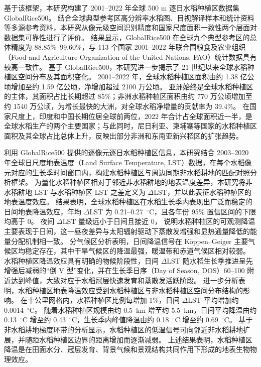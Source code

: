 基于该框架，本研究构建了 2001--2022 年全球 500 m 逐日水稻种植区数据集 GlobalRice500。
结合全球典型参考区高分辨率水稻图、目视解译样本和统计资料等多源参考资料，本研究从像元级空间识别精度和国家尺度面积一致性两个层面对数据集可靠性进行了评价。%
结果显示，GlobalRice500 在全球九个典型参考区的总体精度为 88.85\%--99.60\%，与 113 个国家 2001--2022 年联合国粮食及农业组织（Food and Agriculture Organization of the United Nations, FAO）统计数据具有较高一致性。%
基于 GlobalRice500，本研究进一步揭示了 21 世纪以来全球水稻种植区空间分布及其面积变化。
2001--2022 年，全球水稻种植区面积由约 1.38 亿公顷增加至约 1.59 亿公顷，净增加超过 2100 万公顷。
亚洲始终是全球水稻种植区的主体，其面积占比长期超过 85\%；非洲水稻种植区面积由约 770 万公顷增加至约 1540 万公顷，为增长最快的大洲，对全球水稻净增量的贡献率为 39.4\%。
在国家尺度上，印度和中国长期位居全球前两位，2022 年合计占全球面积近一半，是全球水稻生产的两个主要国家；与此同时，尼日利亚、柬埔寨等国家的水稻种植区面积及其全球占比总体上升，反映出部分非洲和东南亚新兴稻区的扩张趋势。

利用 GlobalRice500 提供的逐像元逐日水稻种植区信息，本研究结合 2003--2020 年全球日尺度地表温度（Land Surface Temperature, LST）数据，在每个水稻像元对应的生长季时间窗口内，构建水稻种植区与周边同期非水稻耕地的匹配对照分析框架。
为量化水稻种植区相对于邻近非水稻耕地的地表温度差异，本研究将非水稻耕地 LST 与水稻种植区 LST 之差定义为 $\Delta \mathrm{LST}$，并以此表征水稻种植区的地表温度效应。
结果表明，全球水稻种植区在水稻生长季内表现出广泛而稳定的日间地表降温效应，年均 $\Delta \mathrm{LST}$ 为 0.21--0.27~$^\circ$C，且各年份 95\% 置信区间的下限均高于 0。
夜间 $\Delta \mathrm{LST}$ 量级远小于日间且接近 0，
说明水稻种植区的可观测降温主要表现于日间，这一昼夜差异与太阳辐射驱动下蒸散发增强和显热通量降低的能量分配机制相一致。
分气候区分析表明，日间降温信号在 Köppen--Geiger 主要气候区均稳定存在，其中干旱气候区的降温最强，暖温带和赤道气候区相对较弱。
水稻种植区降温效应具有明确的物候阶段性，日间 $\Delta \mathrm{LST}$ 随水稻生长季推进呈先增强后减弱的“倒 V 型”变化，并在生长季日序（Day of Season, DOS）60--100 附近达到峰值，大致对应于水稻冠层快速发育和蒸散发活跃阶段。
进一步分析表明，水稻种植区地表降温效应受到水稻种植区与非水稻种植区空间分布结构的影响。
在十公里网格内，水稻种植区比例每增加 1\%，日间 $\Delta \mathrm{LST}$ 平均增加约 0.0014~$^\circ$C。
随着水稻种植区规模由约 0.5~km 增至约 5.5~km，日间平均降温由约 0.13~$^\circ$C 增至约 0.43~$^\circ$C，生长季内峰值降温由约 0.18~$^\circ$C 增至约 0.69~$^\circ$C。
基于非水稻耕地梯度环带的分析显示，水稻种植区的低温信号可向邻近非水稻耕地扩展，并随距水稻种植区边界的距离增加而逐渐减弱。
上述结果表明，水稻种植区降温是在田面水分、冠层发育、背景气候和景观结构共同作用下形成的地表生物物理效应。

